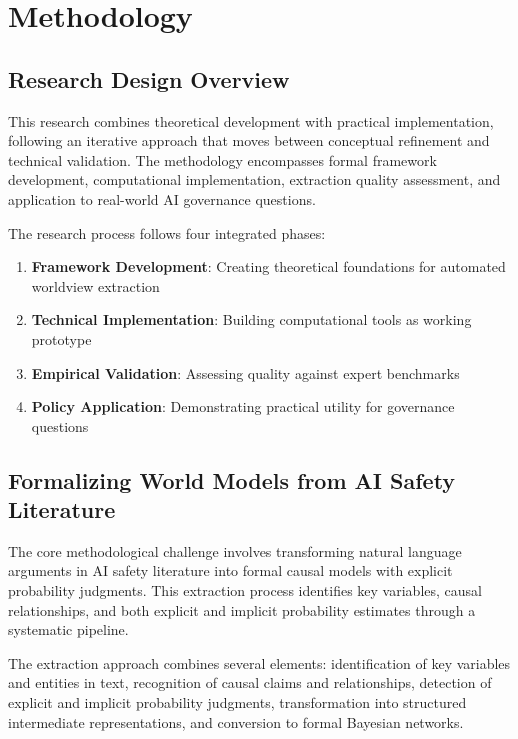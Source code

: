 \documentclass[
  11pt,
  letterpaper,
]{book}
\providecommand{\tightlist}{%
  \setlength{\itemsep}{0pt}\setlength{\parskip}{0pt}}
\begin{document}
\section{Methodology}\label{sec-methodology}

\subsection{Research Design Overview}\label{sec-research-design}

This research combines theoretical development with practical
implementation, following an iterative approach that moves between
conceptual refinement and technical validation. The methodology
encompasses formal framework development, computational implementation,
extraction quality assessment, and application to real-world AI
governance questions.

The research process follows four integrated phases:

\begin{enumerate}
\def\labelenumi{\arabic{enumi}.}
\tightlist
\item
  \textbf{Framework Development}: Creating theoretical foundations for
  automated worldview extraction
\item
  \textbf{Technical Implementation}: Building computational tools as
  working prototype
\item
  \textbf{Empirical Validation}: Assessing quality against expert
  benchmarks
\item
  \textbf{Policy Application}: Demonstrating practical utility for
  governance questions
\end{enumerate}

\subsection{Formalizing World Models from AI Safety
Literature}\label{sec-formalizing-world-models}

The core methodological challenge involves transforming natural language
arguments in AI safety literature into formal causal models with
explicit probability judgments. This extraction process identifies key
variables, causal relationships, and both explicit and implicit
probability estimates through a systematic pipeline.

The extraction approach combines several elements: identification of key
variables and entities in text, recognition of causal claims and
relationships, detection of explicit and implicit probability judgments,
transformation into structured intermediate representations, and
conversion to formal Bayesian networks.
\end{document}
